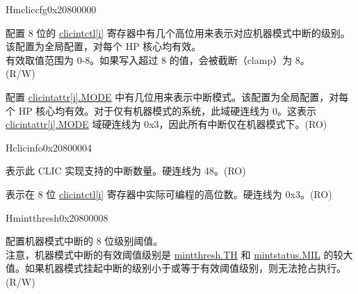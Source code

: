\begin{register}{H}{{mcliccfg}}{0x20800000}\label{regdesc:MCLICCFG_REG}
%
%
%
%
\regnewline%
\begin{regdesc}
\begin{reglist}
\label{fielddesc:MCLICCFG_MNLBITS}\item [MNLBITS] 配置 8 位的 \hyperref[regdesc:MCLICINTCTL_REG_i]{clicintctl[i]} 寄存器中有几个高位用来表示对应机器模式中断的级别。该配置为全局配置，对每个 HP 核心均有效。\\
有效取值范围为 0-8。如果写入超过 8 的值，会被截断（clamp）为 8。\\
(R/W)
\label{fielddesc:MCLICCFG_NMBITS}\item [NMBITS] 配置 \hyperref[fielddesc:MCLICINTATTR_i_MODE]{clicintattr[i].MODE} 中有几位用来表示中断模式。该配置为全局配置，对每个 HP 核心均有效。对于仅有机器模式的系统，此域硬连线为 0。这表示 \hyperref[fielddesc:MCLICINTATTR_i_MODE]{clicintattr[i].MODE} 域硬连线为 0x3，因此所有中断仅在机器模式下。(RO) \\
\end{reglist}
\end{regdesc}
\end{register}

\begin{register}{H}{{clicinfo}}{0x20800004}\label{regdesc:CLICINFO_REG}
%
%
%
%
\regnewline%
\begin{regdesc}
\begin{reglist}
\label{fielddesc:CLICINFO_NUM_INTERRUPTS}\item [NUM\_INTERRUPTS] 表示此 CLIC 实现支持的中断数量。硬连线为 48。(RO)
\label{fielddesc:CLICINFO_CLICINTCTLBITS}\item [CLICINTCTLBITS] 表示在 8 位 \hyperref[regdesc:MCLICINTCTL_REG_i]{clicintctl[i]} 寄存器中实际可编程的高位数。硬连线为 0x3。(RO)
\end{reglist}
\end{regdesc}
\end{register}

\begin{register}{H}{mintthresh}{0x20800008}\label{regdesc:MINTTHRESH}
%
%
\regnewline%
\begin{regdesc}\begin{reglist}
\label{fielddesc:MINTTHRESH_TH}\item [TH] 配置机器模式中断的 8 位级别阈值。 \\
注意，机器模式中断的有效阈值级别是 \hyperref[fielddesc:MINTTHRESH_TH]{{mintthresh.TH}} 和 \hyperref[fielddesc:MINTSTATUS_MIL]{{mintstatus.MIL}} 的较大值。如果机器模式挂起中断的级别小于或等于有效阈值级别，则无法抢占执行。\\(R/W)
\end{reglist}\end{regdesc}
\end{register}

